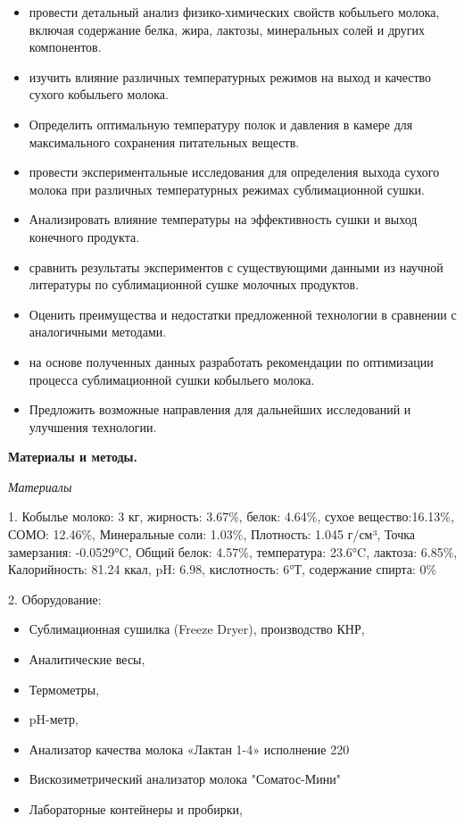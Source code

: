 \begin{multicols}{2}
\begin{itemize}
\item
  провести детальный анализ физико-химических свойств кобыльего молока,
  включая содержание белка, жира, лактозы, минеральных солей и других
  компонентов.
\item
  изучить влияние различных температурных режимов на выход и качество
  сухого кобыльего молока.
\item
  Определить оптимальную температуру полок и давления в камере для
  максимального сохранения питательных веществ.
\item
  провести экспериментальные исследования для определения выхода сухого
  молока при различных температурных режимах сублимационной сушки.
\item
  Анализировать влияние температуры на эффективность сушки и выход
  конечного продукта.
\item
  сравнить результаты экспериментов с существующими данными из научной
  литературы по сублимационной сушке молочных продуктов.
\item
  Оценить преимущества и недостатки предложенной технологии в сравнении
  с аналогичными методами.
\item
  на основе полученных данных разработать рекомендации по оптимизации
  процесса сублимационной сушки кобыльего молока.
\item
  Предложить возможные направления для дальнейших исследований и
  улучшения технологии.
\end{itemize}

{\bfseries Материалы и методы.}

\emph{Материалы}

1. Кобылье молоко: 3 кг, жирность: 3.67\%, белок: 4.64\%, сухое
вещество:16.13\%, СОМО: 12.46\%, Минеральные соли: 1.03\%, Плотность:
1.045 г/см³, Точка замерзания: -0.0529°C, Общий белок: 4.57\%,
температура: 23.6°C, лактоза: 6.85\%, Калорийность: 81.24 ккал, pH:
6.98, кислотность: 6°Т, содержание спирта: 0\%

2. Оборудование:

\begin{itemize}
\item
  Сублимационная сушилка (Freeze Dryer), производство КНР,
\item
  Аналитические весы,
\item
  Термометры,
\item
  pH-метр,
\item
  Анализатор качества молока «Лактан 1-4» исполнение 220
\item
  Вискозиметрический анализатор молока "Соматос-Мини"
\item
  Лабораторные контейнеры и пробирки,
\end{itemize}


\end{multicols}
